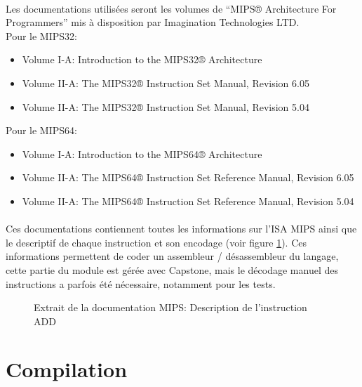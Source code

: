 \documentclass[11pt, book, english, french, standardlists]{upmethodology-document}
\begin{document}
				\paragraph*{}
					Les documentations utilisées seront les volumes de ``MIPS® Architecture For Programmers'' mis à disposition par Imagination Technologies LTD.\\
					Pour le MIPS32:
					\begin{itemize}
						\item Volume I-A: Introduction to the MIPS32® Architecture\cite{MIPS32Arch}
						\item Volume II-A: The MIPS32® Instruction Set Manual, Revision 6.05\cite{MIPS32InstrSet605}
						\item Volume II-A: The MIPS32® Instruction Set Manual, Revision 5.04\cite{MIPS32InstrSet504}
					\end{itemize}
					Pour le MIPS64:
					\begin{itemize}
						\item Volume I-A: Introduction to the MIPS64® Architecture\cite{MIPS64Arch}
						\item Volume II-A: The MIPS64® Instruction Set Reference Manual, Revision 6.05\cite{MIPS64InstrSet605}
						\item Volume II-A: The MIPS64® Instruction Set Reference Manual, Revision 5.04\cite{MIPS64InstrSet504}
					\end{itemize}
				\paragraph*{}
					Ces documentations contiennent toutes les informations sur l'\gls{ISA} \gls{MIPS} ainsi que le descriptif de chaque instruction et son encodage (voir figure \ref{fig:MIPS_Description_instruction_ADD}). Ces informations permettent de coder un assembleur / désassembleur du langage, cette partie du module est gérée avec Capstone, mais le décodage manuel des instructions a parfois été nécessaire, notamment pour les tests.
					\begin{figure}[H]
						\centering
						\caption{Extrait de la documentation \acrshort{MIPS}: Description de l'instruction ADD\cite{MIPS64InstrSet605}}
						\label{fig:MIPS_Description_instruction_ADD}
					\end{figure}
		\section{Compilation}
\end{document}
